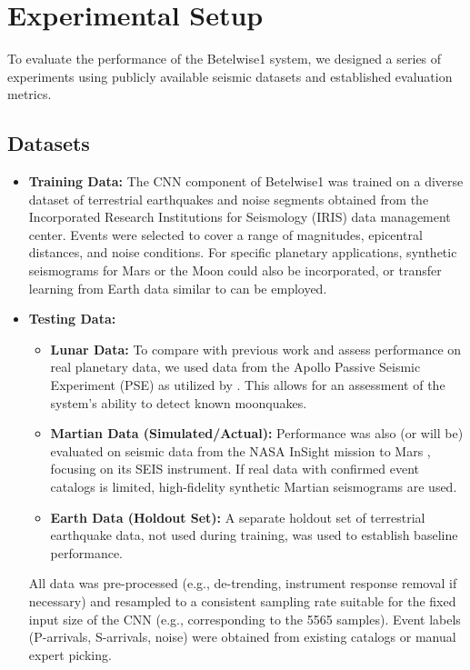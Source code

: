 \documentclass[11pt,a4paper]{article}
\begin{document}
\section{Experimental Setup}
To evaluate the performance of the Betelwise1 system, we designed a series of experiments using publicly available seismic datasets and established evaluation metrics.

\subsection{Datasets}
\begin{itemize}
    \item \textbf{Training Data:} The CNN component of Betelwise1 was trained on a diverse dataset of terrestrial earthquakes and noise segments obtained from the Incorporated Research Institutions for Seismology (IRIS) data management center. Events were selected to cover a range of magnitudes, epicentral distances, and noise conditions. For specific planetary applications, synthetic seismograms for Mars \citep{clinton2017marsquake} or the Moon could also be incorporated, or transfer learning from Earth data similar to \citet{civilini2021detecting} can be employed.
    \item \textbf{Testing Data:}
    \begin{itemize}
        \item \textbf{Lunar Data:} To compare with previous work and assess performance on real planetary data, we used data from the Apollo Passive Seismic Experiment (PSE) as utilized by \citet{civilini2021detecting}. This allows for an assessment of the system's ability to detect known moonquakes.
        \item \textbf{Martian Data (Simulated/Actual):} Performance was also (or will be) evaluated on seismic data from the NASA InSight mission to Mars \citep{lognonne2019seis, giardini2020seismicity}, focusing on its SEIS instrument. If real data with confirmed event catalogs is limited, high-fidelity synthetic Martian seismograms are used.
        \item \textbf{Earth Data (Holdout Set):} A separate holdout set of terrestrial earthquake data, not used during training, was used to establish baseline performance.
    \end{itemize}
    All data was pre-processed (e.g., de-trending, instrument response removal if necessary) and resampled to a consistent sampling rate suitable for the fixed input size of the CNN (e.g., corresponding to the 5565 samples). Event labels (P-arrivals, S-arrivals, noise) were obtained from existing catalogs or manual expert picking.
\end{itemize}
\end{document}
